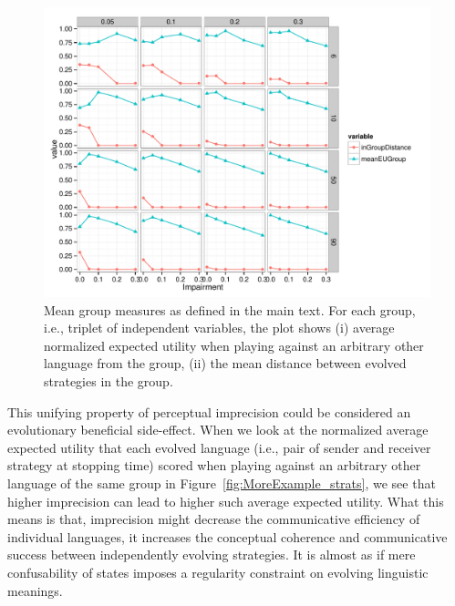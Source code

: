 \begin{figure}
  \centering

    \includegraphics[width=\textwidth]{plots/WithinGroupMeasures.pdf}

    \caption{Mean group measures as defined in the main text. For each
      group, i.e., triplet of independent variables, the plot shows
      (i) average normalized expected utility when playing against an
      arbitrary other language from the group, (ii) the mean distance
      between evolved strategies in the group.}
  \label{fig:AverageEUinGroups}
\end{figure}

This unifying property of perceptual imprecision could be considered
an evolutionary beneficial side-effect. When we look at the normalized
average expected utility that each evolved language (i.e., pair of
sender and receiver strategy at stopping time) scored when playing
against an arbitrary other language of the same group in
Figure~\ref{fig:MoreExample_strats}, we see that higher imprecision
can lead to higher such average expected utility. What this means is
that, imprecision might decrease the communicative efficiency of
individual languages, it increases the conceptual coherence and
communicative success between independently evolving strategies. It is
almost as if mere confusability of states imposes a regularity
constraint on evolving linguistic meanings.




